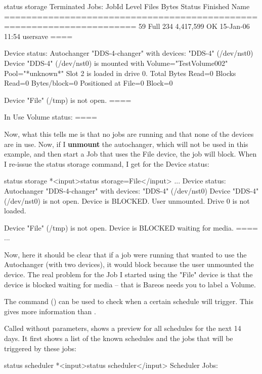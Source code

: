 \begin{description}
\begin{bconsole}{status storage}
Terminated Jobs:
 JobId  Level   Files          Bytes Status   Finished        Name
======================================================================
    59  Full        234      4,417,599 OK       15-Jan-06 11:54 usersave
====

Device status:
Autochanger "DDS-4-changer" with devices:
   "DDS-4" (/dev/nst0)
Device "DDS-4" (/dev/nst0) is mounted with Volume="TestVolume002"
Pool="*unknown*"
    Slot 2 is loaded in drive 0.
    Total Bytes Read=0 Blocks Read=0 Bytes/block=0
    Positioned at File=0 Block=0

Device "File" (/tmp) is not open.
====

In Use Volume status:
====
\end{bconsole}

Now, what this tells me is that no jobs are running and that none of
the devices are in use.  Now, if I {\bf unmount} the autochanger, which
will not be used in this example, and then start a Job that uses the
File device, the job will block.  When I re-issue the status storage
command, I get for the Device status:

\begin{bconsole}{status storage}
*<input>status storage=File</input>
...
Device status:
Autochanger "DDS-4-changer" with devices:
   "DDS-4" (/dev/nst0)
Device "DDS-4" (/dev/nst0) is not open.
    Device is BLOCKED. User unmounted.
    Drive 0 is not loaded.

Device "File" (/tmp) is not open.
    Device is BLOCKED waiting for media.
====
...
\end{bconsole}

Now, here it should be clear that if a job were running that wanted
to use the Autochanger (with two devices), it would block because
the user unmounted the device. The real problem for the Job I started
using the "File" device is that the device is blocked waiting for
media -- that is Bareos needs you to label a Volume.



The command  () can be used to check when a certain schedule will trigger.
This gives more information than .

Called without parameters,  shows a preview for all schedules for the next 14 days.
It first shows a list of the known schedules and the jobs that will be triggered by these jobs:

\begin{bconsole}{status scheduler}
*<input>status scheduler</input>
Scheduler Jobs:


\end{bconsole}
\end{description}
